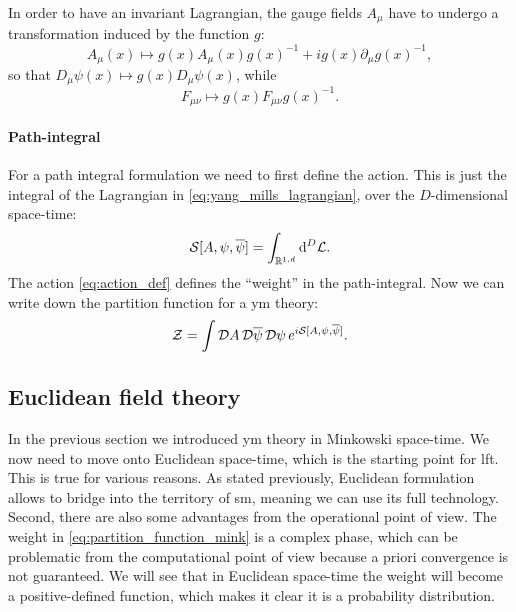 In order to have an invariant Lagrangian, the gauge fields $A_{\mu}$ have to undergo a transformation induced by the function $g$:
\begin{equation}
    A_{\mu}(x) \mapsto g(x) A_{\mu}(x) g(x)^{-1} + i g(x) \partial_{\mu} g(x)^{-1},
\end{equation}
so that $D_{\mu} \psi(x) \mapsto g(x) D_{\mu} \psi(x)$, while
\begin{equation}
    F_{\mu \nu} \mapsto g(x) F_{\mu \nu} g(x)^{-1}.
\end{equation}


\paragraph*{Path-integral}

For a path integral formulation we need to first define the action.
This is just the integral of the Lagrangian in \eqref{eq:yang_mills_lagrangian}, over the $D$-dimensional space-time:
\begin{equation}
    \mathcal{S}[A, \psi, \overline{\psi}] = \int_{\mathbb{R}^{1,d}}  \dd^{D} \mathcal{L}.
    \label{eq:action_def}
\end{equation}
The action \eqref{eq:action_def} defines the ``weight'' in the path-integral.
Now we can write down the partition function for a \ac{ym} theory:
\begin{equation}
    \mathcal{Z} = \int \mathcal{D} A\, \mathcal{D} \overline{\psi}\, \mathcal{D} \psi \, e^{i \mathcal{S}[A, \psi, \overline{\psi}]}.
    \label{eq:partition_function_mink}
\end{equation}


\subsection{Euclidean field theory}
\label{sub:euclidean_field_theory}

In the previous section we introduced \ac{ym} theory in Minkowski space-time.
We now need to move onto Euclidean space-time, which is the starting point for \ac{lft}.
This is true for various reasons.
As stated previously, Euclidean formulation allows to bridge into the territory of \ac{sm}, meaning we can use its full technology.
Second, there are also some advantages from the operational point of view.
The weight in \eqref{eq:partition_function_mink} is a complex phase, which can be problematic from the computational point of view because a priori convergence is not guaranteed.
We will see that in Euclidean space-time the weight will become a positive-defined function, which makes it clear it is a probability distribution.

